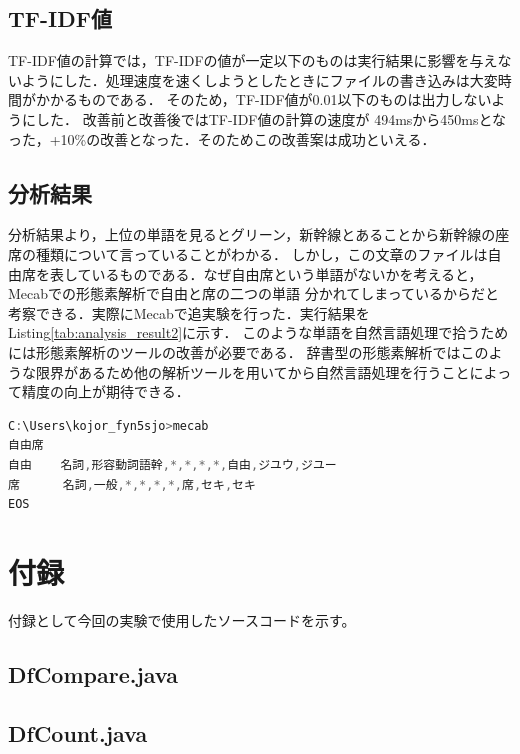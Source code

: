 \documentclass[a4paper,11pt]{ltjsarticle}
\begin{document}
\subsection{TF-IDF値}
TF-IDF値の計算では，TF-IDFの値が一定以下のものは実行結果に影響を与えないようにした．処理速度を速くしようとしたときにファイルの書き込みは大変時間がかかるものである．
そのため，TF-IDF値が0.01以下のものは出力しないようにした．
改善前と改善後ではTF-IDF値の計算の速度が 494msから450msとなった，+10\%の改善となった．そのためこの改善案は成功といえる．
\subsection{分析結果}
分析結果より，上位の単語を見るとグリーン，新幹線とあることから新幹線の座席の種類について言っていることがわかる．
しかし，この文章のファイルは自由席を表しているものである．なぜ自由席という単語がないかを考えると，Mecabでの形態素解析で自由と席の二つの単語
分かれてしまっているからだと考察できる．実際にMecabで追実験を行った．実行結果をListing\ref{tab:analysis_result2}に示す．
このような単語を自然言語処理で拾うためには形態素解析のツールの改善が必要である．
辞書型の形態素解析ではこのような限界があるため他の解析ツールを用いてから自然言語処理を行うことによって精度の向上が期待できる．
\begin{lstlisting}[language=Java, caption=Mecabでの形態素解析結果,label=tab:analysis_result2]
C:\Users\kojor_fyn5sjo>mecab
自由席
自由    名詞,形容動詞語幹,*,*,*,*,自由,ジユウ,ジユー
席      名詞,一般,*,*,*,*,席,セキ,セキ
EOS
\end{lstlisting}

\section{付録}
付録として今回の実験で使用したソースコードを示す。

\subsection*{DfCompare.java}


\subsection*{DfCount.java}

\end{document}
